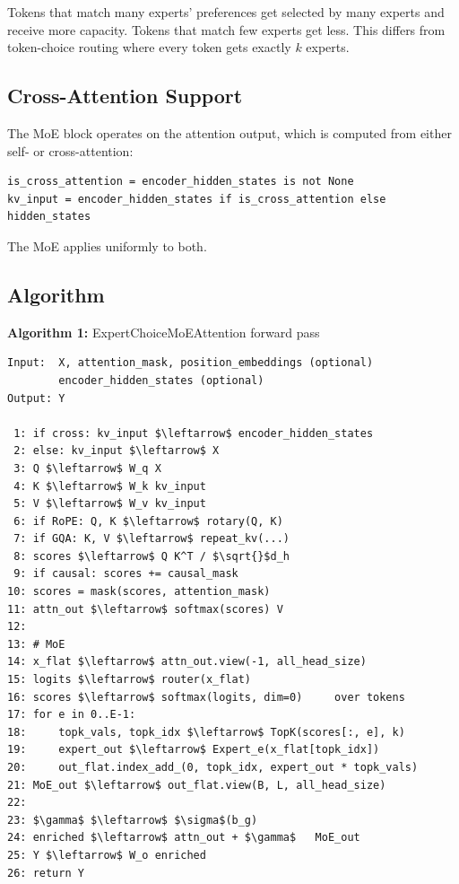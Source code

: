 Tokens that match many experts' preferences get selected by many experts 
and receive more capacity. Tokens that match few experts get less. This 
differs from token-choice routing where every token gets exactly $k$ 
experts.

\subsection{Cross-Attention Support}

The MoE block operates on the attention output, which is computed from 
either self- or cross-attention:

\begin{lstlisting}
is_cross_attention = encoder_hidden_states is not None
kv_input = encoder_hidden_states if is_cross_attention else hidden_states
\end{lstlisting}

The MoE applies uniformly to both.

\subsection{Algorithm}

\textbf{Algorithm 1:} ExpertChoiceMoEAttention forward pass
\begin{lstlisting}
Input:  X, attention_mask, position_embeddings (optional)
        encoder_hidden_states (optional)
Output: Y

 1: if cross: kv_input $\leftarrow$ encoder_hidden_states
 2: else: kv_input $\leftarrow$ X
 3: Q $\leftarrow$ W_q X
 4: K $\leftarrow$ W_k kv_input
 5: V $\leftarrow$ W_v kv_input
 6: if RoPE: Q, K $\leftarrow$ rotary(Q, K)
 7: if GQA: K, V $\leftarrow$ repeat_kv(...)
 8: scores $\leftarrow$ Q K^T / $\sqrt{}$d_h
 9: if causal: scores += causal_mask
10: scores = mask(scores, attention_mask)
11: attn_out $\leftarrow$ softmax(scores) V
12:
13: # MoE
14: x_flat $\leftarrow$ attn_out.view(-1, all_head_size)
15: logits $\leftarrow$ router(x_flat)
16: scores $\leftarrow$ softmax(logits, dim=0)     over tokens
17: for e in 0..E-1:
18:     topk_vals, topk_idx $\leftarrow$ TopK(scores[:, e], k)
19:     expert_out $\leftarrow$ Expert_e(x_flat[topk_idx])
20:     out_flat.index_add_(0, topk_idx, expert_out * topk_vals)
21: MoE_out $\leftarrow$ out_flat.view(B, L, all_head_size)
22:
23: $\gamma$ $\leftarrow$ $\sigma$(b_g)
24: enriched $\leftarrow$ attn_out + $\gamma$   MoE_out
25: Y $\leftarrow$ W_o enriched
26: return Y
\end{lstlisting}

